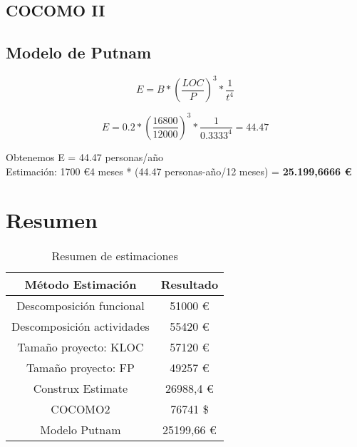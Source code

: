 \subsection{COCOMO II}


\subsection{Modelo de Putnam}

\begin{equation*}
E = B * \left( \frac{LOC}{P} \right)^3 * \frac{1}{t^4} 
\end{equation*}

\begin{equation*}
E = 0.2 * \left( \frac{16800}{12000} \right)^3 * \frac{1}{0.3333^4} = 44.47 
\end{equation*}

Obtenemos E = 44.47 personas/año\\

Estimación: 1700 \euro * 4 meses * (44.47 personas-año/12 meses) = \textbf{25.199,6666 \euro}


\section{Resumen}

\begin{table}[H]
	\begin{center}
		\begin{tabular}{|c||c|}
			\hline 
			Método Estimación & Resultado \\
			\hline \hline
			Descomposición funcional & 51000 \euro \\ \hline
			Descomposición actividades & 55420 \euro \\ \hline
			Tamaño proyecto: KLOC & 57120 \euro \\ \hline
			Tamaño proyecto: FP & 49257 \euro \\ \hline
			Construx Estimate & 26988,4 \euro \\ \hline
			COCOMO2 & 76741 \$ \\ \hline
			Modelo Putnam & 25199,66 \euro \\ \hline
		\end{tabular}
		\caption{Resumen de estimaciones}
		\label{tabla:resumen}
	\end{center}
\end{table}




%
%

       
